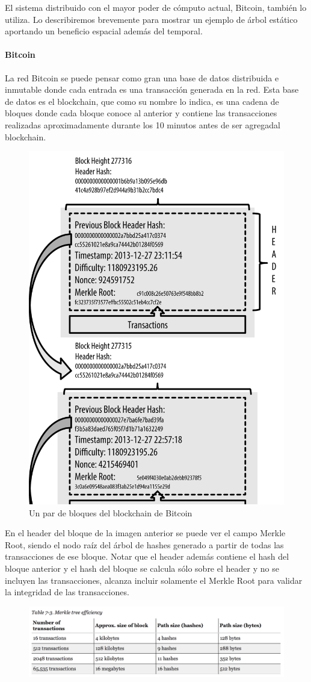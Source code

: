 El sistema distribuido con el mayor poder de cómputo actual, Bitcoin, también lo utiliza. Lo describiremos brevemente para mostrar un ejemplo de árbol estático aportando un beneficio espacial además del temporal. 

\paragraph{Bitcoin}

La red Bitcoin se puede pensar como gran una base de datos distribuida e inmutable donde cada entrada es una transacción generada en la red. Esta base de datos es el blockchain, que como su nombre lo indica, es una cadena de bloques donde cada bloque conoce al anterior y contiene las transacciones realizadas aproximadamente durante los 10 minutos antes de ser agregadal blockchain. 

\begin{figure}[H]
\centering
  \includegraphics[width=.40\linewidth]{imagenes/blockchain.png}
  \caption{Un par de bloques del blockchain de Bitcoin}
\end{figure}

En el header del bloque de la imagen anterior se puede ver el campo Merkle Root, siendo el nodo raíz del árbol de hashes generado a partir de todas las transacciones de ese bloque. Notar que el header además contiene el hash del bloque anterior y el hash del bloque se calcula sólo sobre el header y no se incluyen las transacciones, alcanza incluir solamente el Merkle Root para validar la integridad de las transacciones.


\begin{figure}[H]
\centering
  \includegraphics[width=\linewidth]{imagenes/mt_efficiency.png}
\end{figure}

